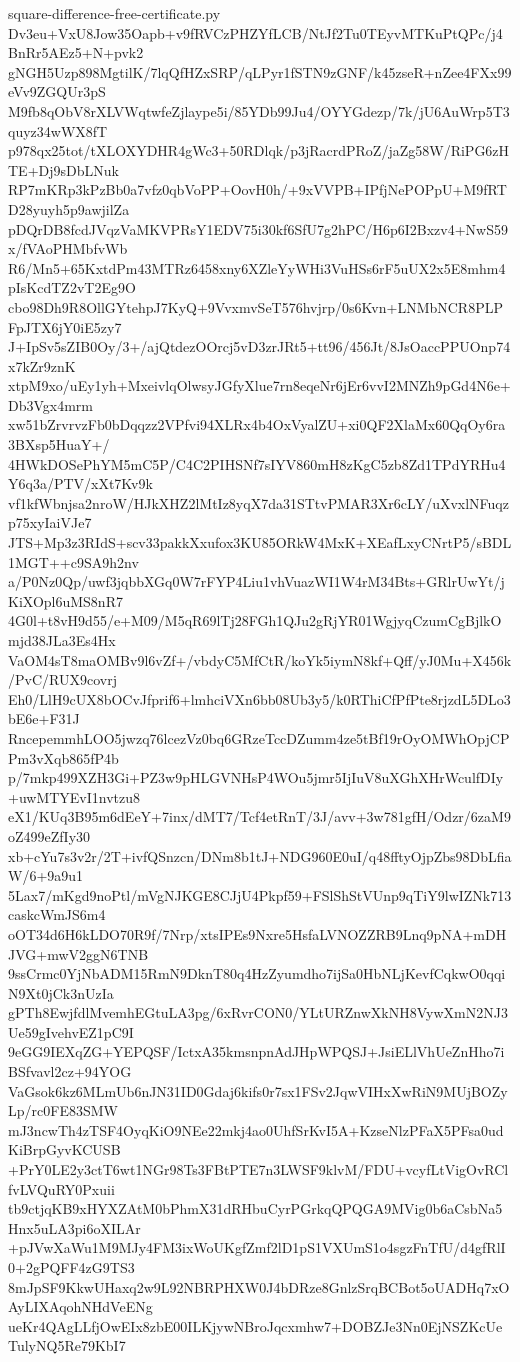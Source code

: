 \documentclass[11pt]{article}
\theoremstyle{definition}
\theoremstyle{remark}
\begin{document}
\begin{filecontents*}[overwrite]{square-difference-free-certificate.py}
Dv3eu+VxU8Jow35Oapb+v9fRVCzPHZYfLCB/NtJf2Tu0TEyvMTKuPtQPc/j4BnRr5AEz5+N+pvk2
gNGH5Uzp898MgtilK/7lqQfHZxSRP/qLPyr1fSTN9zGNF/k45zseR+nZee4FXx99eVv9ZGQUr3pS
M9fb8qObV8rXLVWqtwfeZjlaype5i/85YDb99Ju4/OYYGdezp/7k/jU6AuWrp5T3quyz34wWX8fT
p978qx25tot/tXLOXYDHR4gWc3+50RDlqk/p3jRacrdPRoZ/jaZg58W/RiPG6zHTE+Dj9sDbLNuk
RP7mKRp3kPzBb0a7vfz0qbVoPP+OovH0h/+9xVVPB+IPfjNePOPpU+M9fRTD28yuyh5p9awjilZa
pDQrDB8fcdJVqzVaMKVPRsY1EDV75i30kf6SfU7g2hPC/H6p6I2Bxzv4+NwS59x/fVAoPHMbfvWb
R6/Mn5+65KxtdPm43MTRz6458xny6XZleYyWHi3VuHSs6rF5uUX2x5E8mhm4pIsKcdTZ2vT2Eg9O
cbo98Dh9R8OllGYtehpJ7KyQ+9VvxmvSeT576hvjrp/0s6Kvn+LNMbNCR8PLPFpJTX6jY0iE5zy7
J+IpSv5sZIB0Oy/3+/ajQtdezOOrcj5vD3zrJRt5+tt96/456Jt/8JsOaccPPUOnp74x7kZr9znK
xtpM9xo/uEy1yh+MxeivlqOlwsyJGfyXlue7rn8eqeNr6jEr6vvI2MNZh9pGd4N6e+Db3Vgx4mrm
xw51bZrvrvzFb0bDqqzz2VPfvi94XLRx4b4OxVyalZU+xi0QF2XlaMx60QqOy6ra3BXsp5HuaY+/
4HWkDOSePhYM5mC5P/C4C2PIHSNf7sIYV860mH8zKgC5zb8Zd1TPdYRHu4Y6q3a/PTV/xXt7Kv9k
vf1kfWbnjsa2nroW/HJkXHZ2lMtIz8yqX7da31STtvPMAR3Xr6cLY/uXvxlNFuqzp75xyIaiVJe7
JTS+Mp3z3RIdS+scv33pakkXxufox3KU85ORkW4MxK+XEafLxyCNrtP5/sBDL1MGT++c9SA9h2nv
a/P0Nz0Qp/uwf3jqbbXGq0W7rFYP4Liu1vhVuazWI1W4rM34Bts+GRlrUwYt/jKiXOpl6uMS8nR7
4G0l+t8vH9d55/e+M09/M5qR69lTj28FGh1QJu2gRjYR01WgjyqCzumCgBjlkOmjd38JLa3Es4Hx
VaOM4sT8maOMBv9l6vZf+/vbdyC5MfCtR/koYk5iymN8kf+Qff/yJ0Mu+X456k/PvC/RUX9covrj
Eh0/LlH9cUX8bOCvJfprif6+lmhciVXn6bb08Ub3y5/k0RThiCfPfPte8rjzdL5DLo3bE6e+F31J
RncepemmhLOO5jwzq76lcezVz0bq6GRzeTccDZumm4ze5tBf19rOyOMWhOpjCPPm3vXqb865fP4b
p/7mkp499XZH3Gi+PZ3w9pHLGVNHsP4WOu5jmr5IjIuV8uXGhXHrWculfDIy+uwMTYEvI1nvtzu8
eX1/KUq3B95m6dEeY+7inx/dMT7/Tcf4etRnT/3J/avv+3w781gfH/Odzr/6zaM9oZ499eZfIy30
xb+cYu7s3v2r/2T+ivfQSnzcn/DNm8b1tJ+NDG960E0uI/q48fftyOjpZbs98DbLfiaW/6+9a9u1
5Lax7/mKgd9noPtl/mVgNJKGE8CJjU4Pkpf59+FSlShStVUnp9qTiY9lwIZNk713caskcWmJS6m4
oOT34d6H6kLDO70R9f/7Nrp/xtsIPEs9Nxre5HsfaLVNOZZRB9Lnq9pNA+mDHJVG+mwV2ggN6TNB
9ssCrmc0YjNbADM15RmN9DknT80q4HzZyumdho7ijSa0HbNLjKevfCqkwO0qqiN9Xt0jCk3nUzIa
gPTh8EwjfdlMvemhEGtuLA3pg/6xRvrCON0/YLtURZnwXkNH8VywXmN2NJ3Ue59gIvehvEZ1pC9I
9eGG9IEXqZG+YEPQSF/IctxA35kmsnpnAdJHpWPQSJ+JsiELlVhUeZnHho7iBSfvavl2cz+94YOG
VaGsok6kz6MLmUb6nJN31ID0Gdaj6kifs0r7sx1FSv2JqwVIHxXwRiN9MUjBOZyLp/rc0FE83SMW
mJ3ncwTh4zTSF4OyqKiO9NEe22mkj4ao0UhfSrKvI5A+KzseNlzPFaX5PFsa0udKiBrpGyvKCUSB
+PrY0LE2y3ctT6wt1NGr98Ts3FBtPTE7n3LWSF9klvM/FDU+vcyfLtVigOvRClfvLVQuRY0Pxuii
tb9ctjqKB9xHYXZAtM0bPhmX31dRHbuCyrPGrkqQPQGA9MVig0b6aCsbNa5Hnx5uLA3pi6oXILAr
+pJVwXaWu1M9MJy4FM3ixWoUKgfZmf2lD1pS1VXUmS1o4sgzFnTfU/d4gfRlI0+2gPQFF4zG9TS3
8mJpSF9KkwUHaxq2w9L92NBRPHXW0J4bDRze8GnlzSrqBCBot5oUADHq7xOAyLIXAqohNHdVeENg
ueKr4QAgLLfjOwEIx8zbE00ILKjywNBroJqcxmhw7+DOBZJe3Nn0EjNSZKcUeTulyNQ5Re79KbI7

\end{filecontents*}
\end{document}
